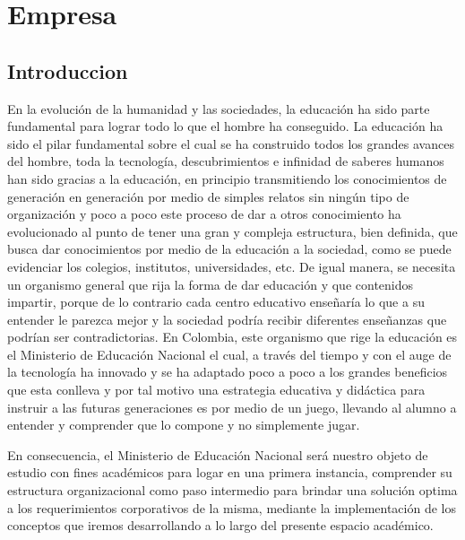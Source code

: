 \chapter{Empresa}
\section{Introduccion}
En la evolución de la humanidad y las sociedades, la educación ha sido parte fundamental para lograr todo lo que el hombre ha conseguido. La educación ha sido el pilar fundamental sobre el cual se ha construido todos los grandes avances del hombre, toda la tecnología, descubrimientos e infinidad de saberes humanos han sido gracias a la educación, en principio transmitiendo los conocimientos de generación en generación por medio de simples relatos sin ningún tipo de organización y poco a poco este proceso de dar a otros conocimiento ha evolucionado al punto de tener una gran y compleja estructura, bien definida, que busca dar conocimientos por medio de la educación a la sociedad, como se puede evidenciar los colegios, institutos, universidades, etc. De igual manera, se necesita un organismo general que rija la forma de dar educación y que contenidos impartir, porque de lo contrario cada centro educativo enseñaría lo que a su entender le parezca mejor y la sociedad podría recibir diferentes enseñanzas que podrían ser contradictorias. En Colombia, este organismo que rige la educación es el Ministerio de Educación Nacional el cual, a través del tiempo y con el auge de la tecnología ha innovado y se ha adaptado poco a poco a los grandes beneficios que esta conlleva y por tal motivo una estrategia educativa y didáctica para instruir a las futuras generaciones es por medio de un juego, llevando al alumno a entender y comprender que lo compone y no simplemente jugar.

En consecuencia, el Ministerio de Educación Nacional será nuestro objeto de estudio con fines académicos para logar en una primera instancia, comprender su estructura organizacional como paso intermedio para brindar una solución optima a los requerimientos corporativos de la misma, mediante la implementación de los conceptos que iremos desarrollando a lo largo del presente espacio académico.


